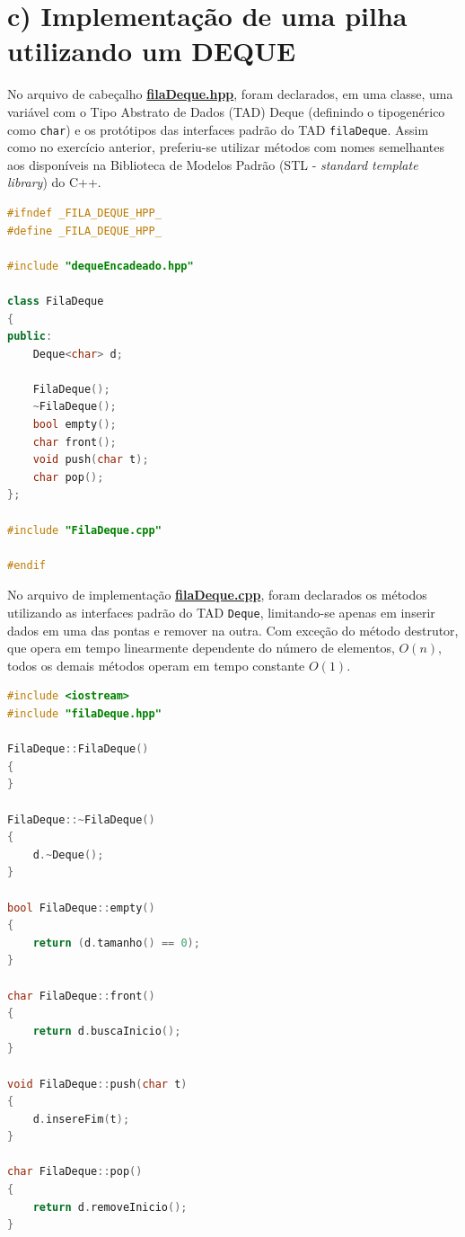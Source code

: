 \documentclass[
  brazilian,
  paper=a4,
  oneside  ,captions=tableheading
]{scrbook}
\newcommand{\passthrough}[1]{#1}
\begin{document}
\hypertarget{c-implementauxe7uxe3o-de-uma-pilha-utilizando-um-deque}{%
\section{c) Implementação de uma pilha utilizando um
DEQUE}\label{c-implementauxe7uxe3o-de-uma-pilha-utilizando-um-deque}}

No arquivo de cabeçalho
\href{https://github.com/ecostadelle/lista_pilhas_filas/blob/main/include/filaDeque.hpp}{\textbf{filaDeque.hpp}},
foram declarados, em uma classe, uma variável com o Tipo Abstrato de
Dados (TAD) Deque (definindo o tipogenérico como
\passthrough{\lstinline!char!}) e os protótipos das interfaces padrão do
TAD \passthrough{\lstinline!filaDeque!}. Assim como no exercício
anterior, preferiu-se utilizar métodos com nomes semelhantes aos
disponíveis na Biblioteca de Modelos Padrão (STL - \emph{standard
template library}) do C++.

\begin{lstlisting}[language={C++}]
#ifndef _FILA_DEQUE_HPP_
#define _FILA_DEQUE_HPP_

#include "dequeEncadeado.hpp"

class FilaDeque
{
public:
    Deque<char> d; 

    FilaDeque();
    ~FilaDeque();
    bool empty();
    char front();
    void push(char t);
    char pop();
}; 

#include "FilaDeque.cpp"

#endif
\end{lstlisting}

No arquivo de implementação
\href{https://github.com/ecostadelle/lista_pilhas_filas/blob/main/include/filaDeque.cpp}{\textbf{filaDeque.cpp}},
foram declarados os métodos utilizando as interfaces padrão do TAD
\passthrough{\lstinline!Deque!}, limitando-se apenas em inserir dados em
uma das pontas e remover na outra. Com exceção do método destrutor, que
opera em tempo linearmente dependente do número de elementos, \(O(n)\),
todos os demais métodos operam em tempo constante \(O(1)\).

\begin{lstlisting}[language={C++}]
#include <iostream>
#include "filaDeque.hpp"

FilaDeque::FilaDeque()
{
}

FilaDeque::~FilaDeque()
{
    d.~Deque();
}

bool FilaDeque::empty()
{
    return (d.tamanho() == 0);
}

char FilaDeque::front()
{
    return d.buscaInicio();
}

void FilaDeque::push(char t)
{
    d.insereFim(t);
}

char FilaDeque::pop()
{
    return d.removeInicio();
}
\end{lstlisting}
\end{document}
